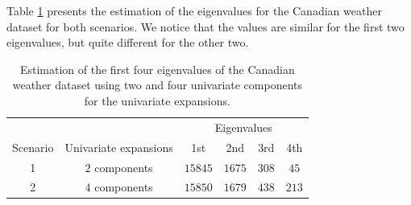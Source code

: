 Table \ref{tab:eigenvalues} presents the estimation of the eigenvalues for the Canadian weather dataset for both scenarios. We notice that the values are similar for the first two eigenvalues, but quite different for the other two. 
\begin{table}[!h]
\centering
\begin{tabular}{c c | c c c c}
 & & \multicolumn{4}{c}{Eigenvalues} \\
Scenario & Univariate expansions & 1st & 2nd & 3rd & 4th \\
\hline
1 & $2$ components & $15845$ & $1675$ & $308$ & $45$ \\
2 & $4$ components & $15850$ & $1679$ & $438$ & $213$ \\
\hline
\end{tabular}
\caption{Estimation of the first four eigenvalues of the Canadian weather dataset using two and four univariate components for the univariate expansions.}
\label{tab:eigenvalues}
\end{table}
